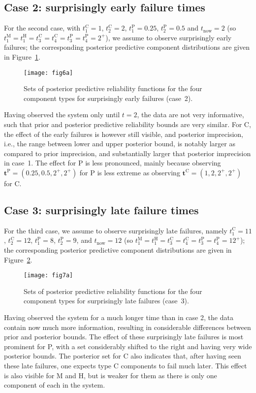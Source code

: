 \documentclass[Journal,SectionNumbers,InsideFigs]{ascelike}
\renewcommand{\vec}[1]{{\bm#1}}
\def\tnow{t_\text{now}}
\begin{document}
\subsection{Case 2: surprisingly early failure times}
\label{sec:ex-case2}

For the second case, with $t_1^\text{C} = 1$, $t_2^\text{C} = 2$, $t_1^\text{P} = 0.25$, $t_2^\text{P} = 0.5$
and $\tnow = 2$ (so $t_1^\text{M} = t_1^\text{H} = t_3^\text{C} = t_4^\text{C} = t_3^\text{P} = t_4^\text{P} = 2^+$),
we assume to observe surprisingly early failures;
the corresponding posterior predictive component distributions are given in Figure~\ref{fig:comppost-2}.
%
\begin{figure}
\texttt{[image: fig6a]}
\caption{Sets of posterior predictive reliability functions for the four component types
for surprisingly early failures (case~2).}
\label{fig:comppost-2}
\end{figure}
%
Having observed the system only until $t = 2$, the data are not very informative,
such that prior and posterior predictive reliability bounds are very similar.
For C, the effect of the early failures is however still visible,
and posterior imprecision, i.e., the range between lower and upper posterior bound, is notably larger
as compared to prior imprecision, and substantially larger that posterior imprecision in case~1.
The effect for P is less pronounced,
mainly because observing $\vec{t}^\text{P} = (0.25, 0.5, 2^+, 2^+)$ for P is less extreme
as observing $\vec{t}^\text{C} = (1, 2, 2^+, 2^+)$ for C.

\subsection{Case 3: surprisingly late failure times}
\label{sec:ex-case3}

For the third case, we assume to observe surprisingly late failures,
namely $t_1^\text{C} = 11$, $t_2^\text{C} = 12$, $t_1^\text{P} = 8$, $t_2^\text{P} = 9$,
and $\tnow = 12$ (so $t_1^\text{M} = t_1^\text{H} = t_3^\text{C} = t_4^\text{C} = t_3^\text{P} = t_4^\text{P} = 12^+$);
the corresponding posterior predictive component distributions are given in Figure~\ref{fig:comppost-3}.
%
\begin{figure}
\texttt{[image: fig7a]}
\caption{Sets of posterior predictive reliability functions for the four component types
for surprisingly late failures (case~3).}
\label{fig:comppost-3}
\end{figure}
%
Having observed the system for a much longer time than in case 2,
the data contain now much more information,
resulting in considerable differences between prior and posterior bounds. %
The effect of these surprisingly late failures is most prominent for P,
with a set considerably shifted to the right and having very wide posterior bounds.
The posterior set for C also indicates that,
after having seen these late failures, one expects type C components to fail much later.
This effect is also visible for M and H,
but is weaker for them as there is only one component of each in the system.
\end{document}
